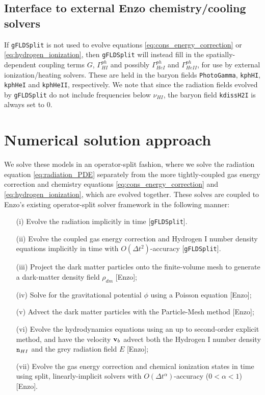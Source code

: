 \documentclass[letterpaper,10pt]{article}
\renewcommand{\(}{\left(}
\renewcommand{\)}{\right)}
\newcommand{\vb}{{\bf v}_b}
\newcommand{\dt}{\Delta t}
\newcommand{\mn}{{\tt n}}
\begin{document}
\subsection{Interface to external Enzo chemistry/cooling solvers}
\label{sec:chem_model_external}

If {\tt gFLDSplit} is not used to evolve equations
\eqref{eq:cons_energy_correction} or \eqref{eq:hydrogen_ionization},
then {\tt gFLDSplit} will instead fill in the spatially-dependent
coupling terms $G$, $\Gamma_{HI}^{ph}$ and possibly
$\Gamma_{HeI}^{ph}$ and $\Gamma_{HeII}^{ph}$, for use by external
ionization/heating solvers.  These are held in the baryon fields 
{\tt PhotoGamma}, {\tt kphHI}, {\tt kphHeI} and {\tt kphHeII},
respectively.  We note that since the radiation fields evolved by 
{\tt gFLDSplit} do not include frequencies below $\nu_{HI}$, the
baryon field {\tt kdissH2I} is always set to 0.




\section{Numerical solution approach}
\label{sec:solution_approach}

We solve these models in an operator-split fashion, where we solve
the radiation equation \eqref{eq:radiation_PDE} separately from the
more tightly-coupled gas energy correction and chemistry equations
\eqref{eq:cons_energy_correction} and \eqref{eq:hydrogen_ionization},
which are evolved together.  These solves are coupled to Enzo's
existing operator-split solver framework in the following manner:
\begin{itemize}
\item[(i)] Evolve the radiation implicitly in time [{\tt gFLDSplit}].
\item[(ii)] Evolve the coupled gas energy correction and Hydrogen I
  number density equations implicitly in time with $O(\dt^2)$-accuracy
  [{\tt gFLDSplit}].  
\item[(iii)] Project the dark matter particles onto the finite-volume
  mesh to generate a dark-matter density field $\rho_{dm}$ [Enzo];
\item[(iv)] Solve for the gravitational potential $\phi$ using a
  Poisson equation [Enzo];
\item[(v)] Advect the dark matter particles with the Particle-Mesh
  method [Enzo];
\item[(vi)] Evolve the hydrodynamics equations using an up to
  second-order explicit method, and have the velocity $\vb$ advect
  both the Hydrogen I number density $\mn_{HI}$ and the grey radiation
  field $E$ [Enzo]; 
\item[(vii)] Evolve the gas energy correction and chemical ionization
  states in time using split, linearly-implicit solvers with
  $O(\dt^{\alpha})$-accuracy ($0<\alpha<1$) [Enzo].
\end{itemize}
\end{document}
